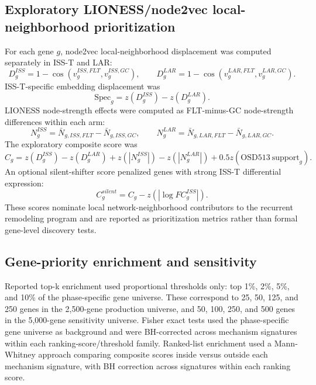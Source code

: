 \documentclass[11pt]{article}
\begin{document}
\subsection{Exploratory LIONESS/node2vec local-neighborhood prioritization}

For each gene $g$, node2vec local-neighborhood displacement was computed separately in ISS-T and LAR:
\begin{equation}
D_g^{ISS}=1-\cos(v^{ISS,FLT}_g,v^{ISS,GC}_g),
\qquad
D_g^{LAR}=1-\cos(v^{LAR,FLT}_g,v^{LAR,GC}_g).
\end{equation}
ISS-T-specific embedding displacement was
\begin{equation}
\mathrm{Spec}_g=z(D_g^{ISS})-z(D_g^{LAR}).
\end{equation}
LIONESS node-strength effects were computed as FLT-minus-GC node-strength differences within each arm:
\begin{equation}
N_g^{ISS}=\bar{N}_{g,ISS,FLT}-\bar{N}_{g,ISS,GC},
\qquad
N_g^{LAR}=\bar{N}_{g,LAR,FLT}-\bar{N}_{g,LAR,GC}.
\end{equation}
The exploratory composite score was
\begin{equation}
C_g=z(D_g^{ISS})-z(D_g^{LAR})+z(|N_g^{ISS}|)-z(|N_g^{LAR}|)+0.5z(\mathrm{OSD513\ support}_g).
\end{equation}
An optional silent-shifter score penalized genes with strong ISS-T differential expression:
\begin{equation}
C^{silent}_g=C_g-z(|\log FC_g^{ISS}|).
\end{equation}
These scores nominate local network-neighborhood contributors to the recurrent remodeling program and are reported as prioritization metrics rather than formal gene-level discovery tests.

\subsection{Gene-priority enrichment and sensitivity}

Reported top-k enrichment used proportional thresholds only: top 1\%, 2\%, 5\%, and 10\% of the phase-specific gene universe. These correspond to 25, 50, 125, and 250 genes in the 2,500-gene production universe, and 50, 100, 250, and 500 genes in the 5,000-gene sensitivity universe. Fisher exact tests used the phase-specific gene universe as background and were BH-corrected across mechanism signatures within each ranking-score/threshold family. Ranked-list enrichment used a Mann-Whitney approach comparing composite scores inside versus outside each mechanism signature, with BH correction across signatures within each ranking score.
\end{document}

